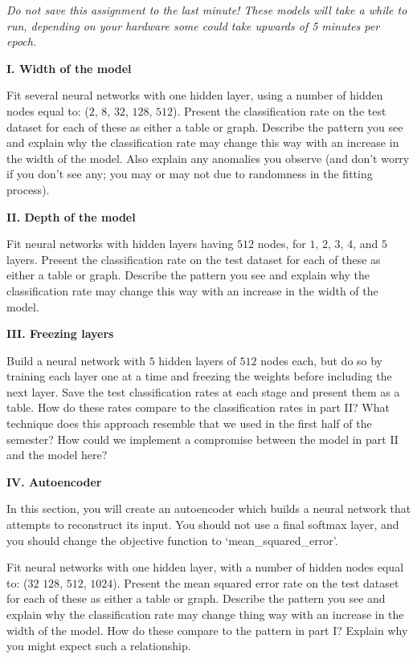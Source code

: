 \documentclass[12pt]{article}
\begin{document}
\textit{Do not save this assignment to the last minute! These models will
take a while to run, depending on your hardware some could take upwards of
5 minutes per epoch.}

\textbf{I. Width of the model}

Fit several neural networks with one hidden layer, using a number of hidden
nodes equal to: ($2$, $8$, $32$, $128$, $512$).
Present the classification rate on the test dataset for each of these as
either a table or graph.
Describe the pattern you see and explain why the classification rate may
change this way with an increase in the width of the model. Also explain
any anomalies you observe (and don't worry if you don't see any; you may
or may not due to randomness in the fitting process).

\textbf{II. Depth of the model}

Fit neural networks with hidden layers having
$512$ nodes, for $1$, $2$, $3$, $4$, and $5$ layers. Present the
classification rate on the test dataset for each of these as either
a table or graph. Describe the pattern you see and explain why the
classification rate may change this way with an increase in the
width of the model.

\textbf{III. Freezing layers}

Build a neural network with $5$ hidden layers of $512$ nodes each, but
do so by training each layer one at a time and freezing the weights before
including the next layer. Save the test classification rates at each stage
and present them as a table. How do these rates compare to the classification
rates in part II? What technique does this approach resemble that we used
in the first half of the semester? How could we implement a compromise between
the model in part II and the model here?

\textbf{IV. Autoencoder}

In this section, you will create an autoencoder which builds a neural network
that attempts to reconstruct its input. You should not use a final softmax layer,
and you should change the objective function to `mean\_squared\_error'.

Fit neural networks with one hidden layer, with a number of hidden
nodes equal to: ($32$ $128$, $512$, $1024$). Present the mean squared error
rate on the test dataset for each of these as either a table or graph.
Describe the pattern you see and explain why the classification rate may
change thing way with an increase in the width of the model. How do these
compare to the pattern in part I? Explain why you might expect such a relationship.
\end{document}
